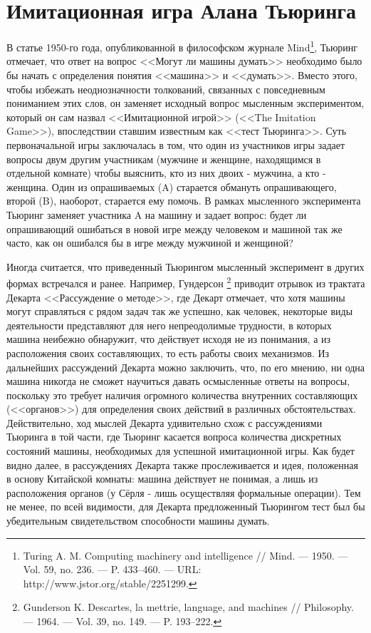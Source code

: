 \documentclass[12pt, specialist, subf, substylefile = spbu.rtx]{disser}
\begin{document}
\chapter{Имитационная игра Алана Тьюринга}
\label{sec:turing}

В статье 1950-го года, опубликованной в философском журнале Mind\footnote{\cite{turing1950computing} Turing A. M. Computing machinery and intelligence // Mind. — 1950. — Vol. 59, no. 236. — P. 433–460. — URL: http://www.jstor.org/stable/2251299.}, Тьюринг отмечает, что ответ на вопрос <<Могут ли машины думать>> необходимо было бы начать с определения понятия <<машина>> и <<думать>>. Вместо этого, чтобы избежать неоднозначности толкований, связанных с повседневным пониманием этих слов, он заменяет исходный вопрос мысленным экспериментом, который он сам назвал <<Имитационной игрой>> (<<The Imitation Game>>), впоследствии ставшим известным как <<тест Тьюринга>>. Суть первоначальной игры заключалась в том, что один из участников игры задает вопросы двум другим участникам (мужчине и женщине, находящимся в отдельной комнате) чтобы выяснить, кто из них двоих - мужчина, а кто - женщина. Один из опрашиваемых (A) старается обмануть опрашивающего, второй (B), наоборот, старается ему помочь. В рамках мысленного эксперимента Тьюринг заменяет участника A на машину и задает вопрос: будет ли опрашивающий ошибаться в новой игре между человеком и машиной так же часто, как он ошибался бы в игре между мужчиной и женщиной?

Иногда считается, что приведенный Тьюрингом мысленный эксперимент в других формах встречался и ранее. Например, Гундерсон \footnote{\cite{Gunderson1964-KEIDLM} Gunderson K. Descartes, la mettrie, language, and machines // Philosophy. — 1964. — Vol. 39, no. 149. — P. 193–222.} приводит отрывок из трактата Декарта <<Рассуждение о методе>>, где Декарт отмечает, что хотя машины могут справляться с рядом задач так же успешно, как человек, некоторые виды деятельности представляют для него непреодолимые трудности, в которых машина неибежно обнаружит, что действует исходя не из понимания, а из расположения своих составляющих, то есть работы своих механизмов. Из дальнейших рассуждений Декарта можно заключить, что, по его мнению, ни одна машина никогда не сможет научиться давать осмысленные ответы на вопросы, поскольку это требует наличия огромного количества внутренних составляющих (<<органов>>) для определения своих действий в различных обстоятельствах. Действительно, ход мыслей Декарта удивительно схож с рассуждениями Тьюринга в той части, где Тьюринг касается вопроса количества дискретных состояний машины, необходимых для успешной имитационной игры. Как будет видно далее, в рассуждениях Декарта также прослеживается и идея, положенная в основу Китайской комнаты: машина действует не понимая, а лишь из расположения органов (у Сёрля - лишь осуществляя формальные операции). Тем не менее, по всей видимости, для Декарта предложенный Тьюрингом тест был бы убедительным свидетельством способности машины думать.
\end{document}
